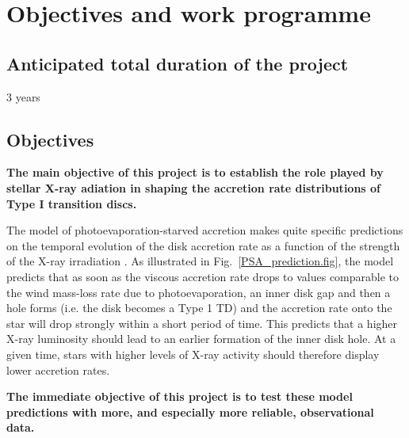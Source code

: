 \documentclass[10pt,fleqn,twoside]{article}
\newcommand{\Tcol}{\color{blue}}
\begin{document}



\section{\Tcol Objectives and work programme}
\renewcommand{\leftmark}{\sc Objectives and work programme}


\subsection{\Tcol Anticipated total duration of the project}

3 years

\subsection{\Tcol Objectives}

\textbf{The main objective of this project is to establish the role played by
stellar X-ray adiation in shaping the accretion rate distributions of
Type I transition discs.}

The model of photoevaporation-starved accretion makes quite specific
predictions on the temporal evolution of the disk accretion rate
as a function of the strength of the X-ray irradiation \citep{Drake09,Owen11}.
As illustrated in Fig.~\ref{PSA_prediction.fig}, the model predicts that
as soon as the viscous accretion rate drops to values comparable to
the wind mass-loss rate due to photoevaporation, an inner disk gap and
then a hole forms
 (i.e. the disk becomes a Type 1 TD) and the accretion rate onto the star will drop strongly within a short period
of time.
This predicts that a higher X-ray luminosity should lead to
an earlier formation of the inner disk hole. At a given time, 
stars with higher levels of X-ray activity should therefore display
lower accretion rates.

\textbf{The immediate objective of this project is to test these model predictions with more, and especially
more reliable, observational data.
}
\end{document}
